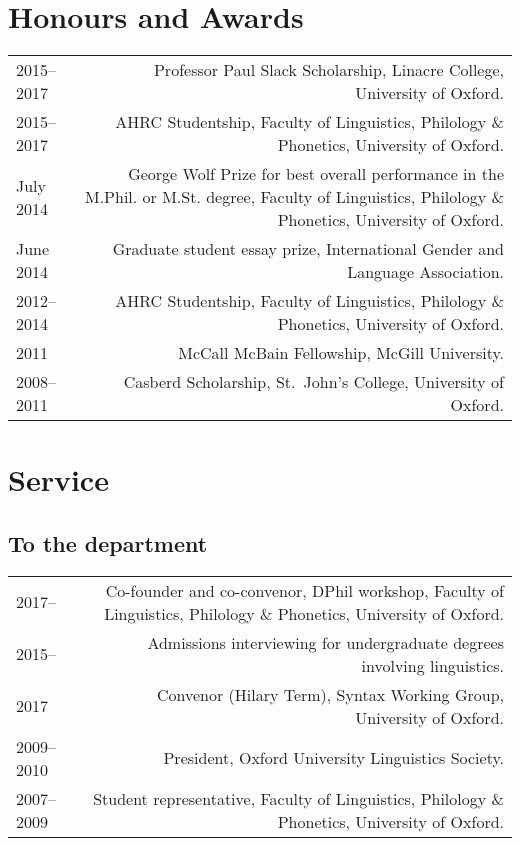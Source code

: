\documentclass[11pt,a4paper,twoside]{article}
\makeatletter
\newenvironment{cvsection}{%
  \setlength{\extrarowheight}{0.70ex}
  \begin{longtable}[l]{@{} L R @{}}
}{%
  \end{longtable}
}
\makeatother
\begin{document}
\section*{Honours and Awards}

\begin{cvsection}
  2015--2017 	& Professor Paul Slack Scholarship,
  Linacre College, University of Oxford.\\
  2015--2017 	& AHRC Studentship, Faculty of
  Linguistics, Philology \& Phonetics, University of Oxford.\\
  July 2014	& George Wolf Prize for best overall
  performance in the M.Phil. or M.St. degree, Faculty of Linguistics,
  Philology \& Phonetics, University of Oxford.\\
  June 2014	& Graduate student essay prize,
  International Gender and Language Association.\\
  2012--2014	& AHRC Studentship, Faculty of
  Linguistics, Philology \& Phonetics, University of Oxford.\\
  2011		& McCall McBain Fellowship, McGill University.\\
  2008--2011	& Casberd Scholarship, St.\ John's
  College, University of Oxford.\\
\end{cvsection}

\section*{Service}

\subsection*{To the department}

\begin{cvsection}
  2017--      & Co-founder and co-convenor, DPhil workshop, Faculty of Linguistics, Philology \& Phonetics, University of Oxford.\\
  2015--      & Admissions interviewing for undergraduate degrees involving linguistics.\\
  2017 		    & Convenor (Hilary Term), Syntax Working Group, University of Oxford.\\
  2009--2010	& President, Oxford University Linguistics Society.\\
  2007--2009	& Student representative, Faculty of Linguistics, Philology \& Phonetics, University of Oxford.\\
\end{cvsection}
\end{document}
